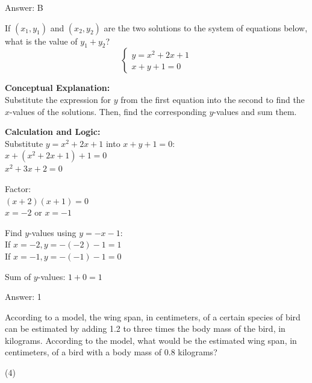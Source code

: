\documentclass[11pt,paper=a4,answers]{exam}
\begin{document}
\begin{questions}
\begin{solution}
Answer: \colorbox{yellow!100}{B}
\end{solution}

\vspace{40pt}

\question
If $(x_1, y_1)$ and $(x_2, y_2)$ are the two solutions to the system of equations below, what is the value of $y_1 + y_2$?
\[ \begin{cases} y = x^2 + 2x + 1 \\ x + y + 1 = 0 \end{cases} \]

\begin{solution}
\textbf{Conceptual Explanation:} \\
Substitute the expression for $y$ from the first equation into the second to find the $x$-values of the solutions. Then, find the corresponding $y$-values and sum them.

\vspace{20pt}

\textbf{Calculation and Logic:} \\
Substitute $y = x^2 + 2x + 1$ into $x + y + 1 = 0$: \\
$x + (x^2 + 2x + 1) + 1 = 0$ \\
$x^2 + 3x + 2 = 0$

\vspace{10pt}

Factor: \\
$(x + 2)(x + 1) = 0$ \\
$x = -2$ or $x = -1$

\vspace{10pt}

Find $y$-values using $y = -x - 1$: \\
If $x = -2, y = -(-2) - 1 = 1$ \\
If $x = -1, y = -(-1) - 1 = 0$

\vspace{10pt}

Sum of $y$-values: $1 + 0 = 1$

\vspace{25pt}

Answer: \colorbox{yellow!100}{1}
\end{solution}

\question
According to a model, the wing span, in centimeters, of a certain species of bird can be estimated by adding 1.2 to three times the body mass of the bird, in kilograms. According to the model, what would be the estimated wing span, in centimeters, of a bird with a body mass of 0.8 kilograms?
\begin{tasks}(4)
\end{tasks}


\end{questions}
\end{document}
